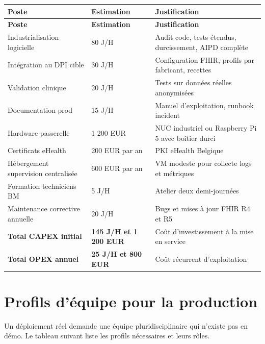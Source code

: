 \bridgezebra
\begin{longtable}{p{4.5cm}p{3.5cm}p{6cm}}
  \toprule
  \rowcolor{bridgeblue!90}
  {\color{white}\bfseries Poste} & {\color{white}\bfseries Estimation} & {\color{white}\bfseries Justification} \\
  \midrule
  \endfirsthead
  \toprule
  \rowcolor{bridgeblue!90}
  {\color{white}\bfseries Poste} & {\color{white}\bfseries Estimation} & {\color{white}\bfseries Justification} \\
  \midrule
  \endhead
  \bottomrule
  \endfoot
  Industrialisation logicielle           & 80 J/H              & Audit code, tests étendus, durcissement, AIPD complète \\
  Intégration au DPI cible               & 30 J/H              & Configuration FHIR, profils par fabricant, recettes \\
  Validation clinique                    & 20 J/H              & Tests sur données réelles anonymisées \\
  Documentation prod                     & 15 J/H              & Manuel d'exploitation, runbook incident \\
  Hardware passerelle                    & 1 200 EUR           & NUC industriel ou Raspberry Pi 5 avec boîtier durci \\
  Certificats eHealth                    & 200 EUR par an      & PKI eHealth Belgique \\
  Hébergement supervision centralisée    & 600 EUR par an      & VM modeste pour collecte logs et métriques \\
  Formation techniciens BM               & 5 J/H               & Atelier deux demi-journées \\
  Maintenance corrective annuelle        & 20 J/H              & Bugs et mises à jour FHIR R4 et R5 \\
  \textbf{Total CAPEX initial}           & \textbf{145 J/H et 1 200 EUR} & Coût d'investissement à la mise en service \\
  \textbf{Total OPEX annuel}             & \textbf{25 J/H et 800 EUR}    & Coût récurrent d'exploitation \\
\end{longtable}

\section{Profils d'équipe pour la production}
\label{sec:budget-profils-equipe}

Un déploiement réel demande une équipe pluridisciplinaire qui n'existe pas en démo. Le tableau suivant liste les profils nécessaires et leurs rôles.

